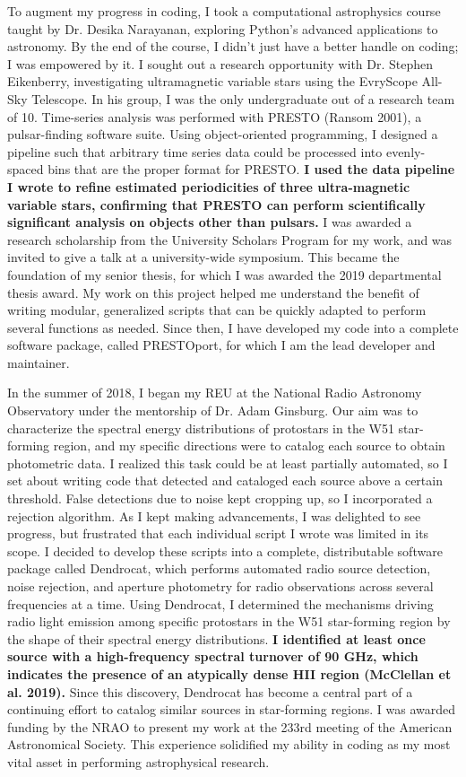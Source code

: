 \documentclass[11pt]{article}
\begin{document}
To augment my progress in coding, I took a computational astrophysics course taught by Dr. Desika Narayanan, exploring Python's advanced applications to astronomy. By the end of the course, I didn't just have a better handle on coding; I was empowered by it. I sought out a research opportunity with Dr. Stephen Eikenberry, investigating ultramagnetic variable stars using the EvryScope All-Sky Telescope. In his group, I was the only undergraduate out of a research team of 10. Time-series analysis was performed with PRESTO (Ransom 2001), a pulsar-finding software suite. Using object-oriented programming, I designed a pipeline such that arbitrary time series data could be processed into evenly-spaced bins that are the proper format for PRESTO. \textbf{I used the data pipeline I wrote to refine estimated periodicities of three ultra-magnetic variable stars, confirming that PRESTO can perform scientifically significant analysis on objects other than pulsars.} I was awarded a research scholarship from the University Scholars Program for my work, and was invited to give a talk at a university-wide symposium. This became the foundation of my senior thesis, for which I was awarded the 2019 departmental thesis award. My work on this project helped me understand the benefit of writing modular, generalized scripts that can be quickly adapted to perform several functions as needed. Since then, I have developed my code into a complete software package, called PRESTOport, for which I am the lead developer and maintainer.

In the summer of 2018, I began my REU at the National Radio Astronomy Observatory under the mentorship of Dr. Adam Ginsburg. Our aim was to characterize the spectral energy distributions of protostars in the W51 star-forming region, and my specific directions were to catalog each source to obtain photometric data. I realized this task could be at least partially automated, so I set about writing code that detected and cataloged each source above a certain threshold. False detections due to noise kept cropping up, so I incorporated a rejection algorithm. As I kept making advancements, I was delighted to see progress, but frustrated that each individual script I wrote was limited in its scope. I decided to develop these scripts into a complete, distributable software package called Dendrocat, which performs automated radio source detection, noise rejection, and aperture photometry for radio observations across several frequencies at a time. Using Dendrocat, I determined the mechanisms driving radio light emission among specific protostars in the W51 star-forming region by the shape of their spectral energy distributions. \textbf{I identified at least once source with a high-frequency spectral turnover of 90 GHz, which indicates the presence of an atypically dense HII region (McClellan et al. 2019).} Since this discovery, Dendrocat has become a central part of a continuing effort to catalog similar sources in star-forming regions. I was awarded funding by the NRAO to present my work at the 233rd meeting of the American Astronomical Society. This experience solidified my ability in coding as my most vital asset in performing astrophysical research.
\end{document}
